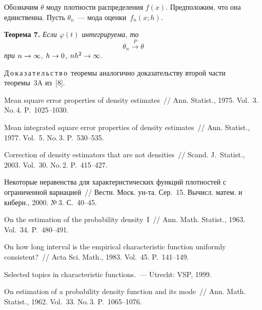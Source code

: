 \begin{multicols}{2}
\smallskip

Обозначим $\theta$ моду плотности распределения $f(x)$.
Предположим, что она единственна. Пусть $\theta_n$~---
мода оценки~$f_n(x;h)$.

\medskip

\noindent
\textbf{Теорема 7.} \textit{Если $\varphi(t)$ интегрируема, то}
$$
\theta_n\xrightarrow{P}\theta
$$
\textit{при $n\hm\to\infty$, $h\hm\to0$, $nh^2\hm\to\infty$}.


\medskip

\noindent
Д\,о\,к\,а\,з\,а\,т\,е\,л\,ь\,с\,т\,в\,о\ 
теоремы аналогично доказательству второй части теоремы~3A из~[8].


{\small\frenchspacing
{%
\begin{thebibliography}{9}

 Mean square error properties of density
estimates~// Ann. Statist., 1975. Vol.~3. No.\,4. P.~1025--1030.

 Mean integrated square error properties of
density estimates~// Ann. Statist., 1977. Vol.~5. No.\,3. P.~530--535.

 Correction of
density estimators that are not densities~// Scand. J.~Statist.,
2003. Vol.~30. No.\,2. P.~415--427.

 Некоторые неравенства для
характеристических функций плотностей с ограниченной вариацией~//
Вестн. Моск. ун-та. Сер.~15. Вычисл. матем. и киберн., 2000. №\,3. С.~40--45.

 On the estimation of the
probability density~I~//  Ann. Math. Statist., 1963. Vol.~34. P.~480--491.


 On how long interval is the
empirical characteristic function uniformly consistent?~// Acta Sci.
Math., 1983. Vol.~45. P.~141--149.


 Selected topics in characteristic functions.~--- Utrecht: VSP, 1999.

\label{end\stat}

 On estimation of a probability density function
and its mode~// Ann. Math. Statist., 1962. Vol.~33. No.\,3. P.~1065--1076.
 \end{thebibliography}
}
}


\end{multicols}       